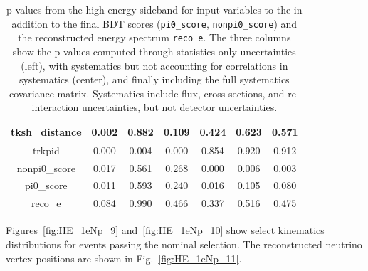 \begin{table}[H]
\begin{tabular}{| c | c | c | c | c | c | c | }
tksh\_distance & 0.002 & 0.882 & 0.109 & 0.424 & 0.623 & 0.571 \\ \hline
trkpid & 0.000 & 0.004 & 0.000 & 0.854 & 0.920 & 0.912 \\ \hline
nonpi0\_score & 0.017 & 0.561 & 0.268 & 0.000 & 0.006 & 0.003 \\ \hline
pi0\_score & 0.011 & 0.593 & 0.240 & 0.016 & 0.105 & 0.080 \\ \hline
reco\_e & 0.084 & 0.990 & 0.466 & 0.337 & 0.516 & 0.475 \\ \hline
 \end{tabular}
 \caption{\label{tab:HiENPpvalues}p-values from the high-energy \npsel sideband for input variables to the \npsel in addition to the final BDT scores (\texttt{pi0\_score}, \texttt{nonpi0\_score}) and the reconstructed energy spectrum \texttt{reco\_e}. The three columns show the p-values computed through statistics-only uncertainties (left), with systematics but not accounting for correlations in systematics (center), and finally including the full systematics covariance matrix. Systematics include flux, cross-sections, and re-interaction uncertainties, but not detector uncertainties.}
\end{table}

Figures~\ref{fig:HE_1eNp_9} and~\ref{fig:HE_1eNp_10} show select kinematics distributions for \npsel events passing the nominal selection.
The reconstructed neutrino vertex positions are shown in Fig.~\ref{fig:HE_1eNp_11}.

